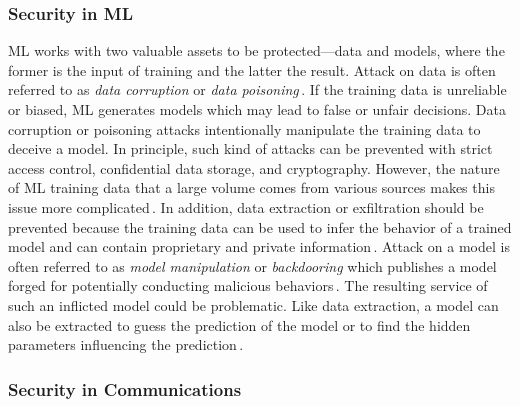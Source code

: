 \documentclass[11pt]{article}
\begin{document}
\subsubsection{Security in ML}

ML works with two valuable assets to be protected---data and models, where the former is the input of training and the latter the result. Attack on data is often referred to as \emph{data corruption} or \emph{data poisoning}\,\cite{AIMLThreat}. If the training data is unreliable or biased, ML generates models which may lead to false or unfair decisions. Data corruption or poisoning attacks intentionally manipulate the training data to deceive a model. In principle, such kind of attacks can be prevented with strict access control, confidential data storage, and cryptography. However, the nature of ML training data that a large volume comes from various sources makes this issue more complicated\,\cite{Sarker2020}. In addition, data extraction or exfiltration should be prevented because the training data can be used to infer the behavior of a trained model and can contain proprietary and private information\,\cite{Gary2019}. Attack on a model is often referred to as \emph{model manipulation} or \emph{backdooring} which publishes a model forged for potentially conducting malicious behaviors\,\cite{Gu2017}. The resulting service of such an inflicted model could be problematic. Like data extraction, a model can also be extracted to guess the prediction of the model or to find the hidden parameters influencing the prediction\,\cite{Gary2019}.


\subsubsection{Security in Communications}
\end{document}
